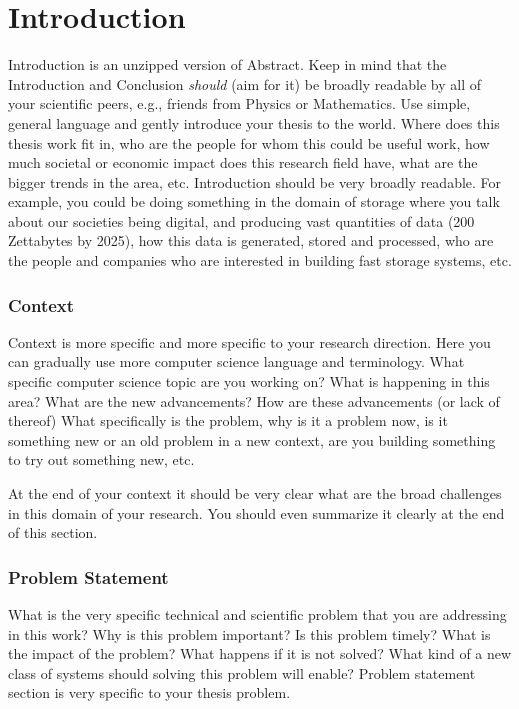 \chapter{Introduction}\label{s:introduction} 
Introduction is an unzipped version of Abstract. Keep in mind that the Introduction and Conclusion \textit{should} (aim for it) be broadly readable by all of your scientific peers, e.g., friends from Physics or Mathematics. Use simple, general language and gently introduce your thesis to the world. Where does this thesis work fit in, who are the people for whom this could be useful work, how much societal or economic impact does this research field have, what are the bigger trends in the area, etc. Introduction should be very broadly readable. For example, you could be doing something in the domain of storage where you talk about our societies being digital, and producing vast quantities of data (200 Zettabytes by 2025), how this data is generated, stored and processed, who are the people and companies who are interested in building fast storage systems, etc. 
\subsection{Context}
Context is more specific and more specific to your research direction. Here you can gradually use more computer science language and terminology. What specific computer science topic are you working on? What is happening in this area? What are the new advancements? How are these advancements (or lack of thereof) What specifically is the problem, why is it a problem now, is it something new or an old problem in a new context, are you building something to try out something new, etc. 

At the end of your context it should be very clear what are the broad challenges in this domain of your research. You should even summarize it clearly at the end of this section. 

\subsection{Problem Statement}
What is the very specific technical and scientific problem that you are addressing in this work? Why is this problem important? Is this problem timely? What is the impact of the problem? What happens if it is not solved? What kind of a new class of systems should solving this problem will enable? Problem statement section is very specific to your thesis problem. 

